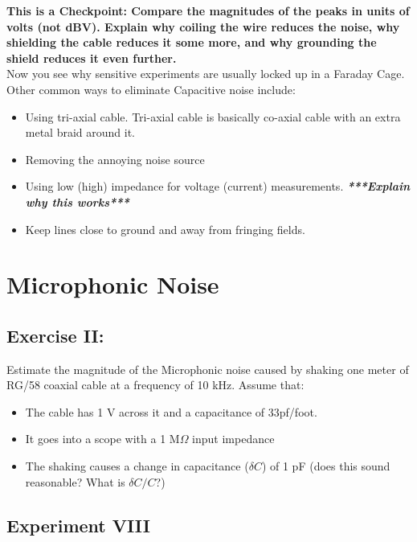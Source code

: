 \documentclass{../lab}
\begin{document}
\textbf{This is a Checkpoint: Compare the magnitudes of the peaks in units of volts (not dBV). Explain why coiling the wire reduces the noise, why shielding the cable reduces it some more, and why grounding the shield reduces it even further.}\\
Now you see why sensitive experiments are usually locked up in a Faraday Cage. Other common ways to eliminate Capacitive noise include:

\begin{itemize}
    \item Using tri-axial cable. Tri-axial cable is basically co-axial cable with an extra metal braid around it.

    \item Removing the annoying noise source

    \item Using low (high) impedance for voltage (current) measurements. \emph{\textbf{***Explain why this works***}}

    \item Keep lines close to ground and away from fringing fields.

\end{itemize}

\section{Microphonic Noise}

\subsection{Exercise II:}

Estimate the magnitude of the Microphonic noise caused by shaking one meter of RG/58 coaxial cable at a frequency of 10 kHz. Assume that:

\begin{itemize}
    \item The cable has 1 V across it and a capacitance of 33pf/foot.

    \item It goes into a scope with a 1 M$\Omega$ input impedance

    \item The shaking causes a change in capacitance ($\delta C$) of 1 pF (does this sound reasonable? What is $\delta C/C$?)

\end{itemize}

\subsection{Experiment VIII}
\end{document}
